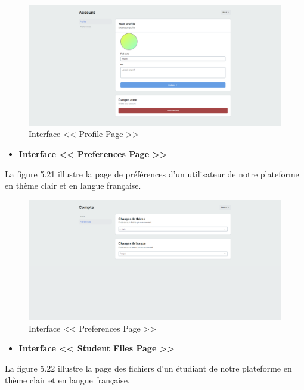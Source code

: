 \begin{figure}[H]
    \centering
    \includegraphics[width=1.1\textwidth,height=0.5\textwidth]{images/chp5/fig20.png}
    \caption{Interface << Profile Page >>}
    \label{Interface << Profile Page >>}    
\end{figure}
\begin{itemize}
    \item \textbf{Interface << Preferences Page >>}
\end{itemize}
La figure 5.21 illustre la page de préférences d'un utilisateur de notre plateforme en thème clair et en langue française.
\begin{figure}[H]
    \centering
    \includegraphics[width=1.1\textwidth,height=0.5\textwidth]{images/chp5/fig21.png}
    \caption{Interface << Preferences Page >>}
    \label{Interface << Preferences Page >>}    
\end{figure}
\begin{itemize}
    \item \textbf{Interface << Student Files Page >>}
\end{itemize}
La figure 5.22 illustre la page des fichiers d'un étudiant de notre plateforme en thème clair et en langue française.
